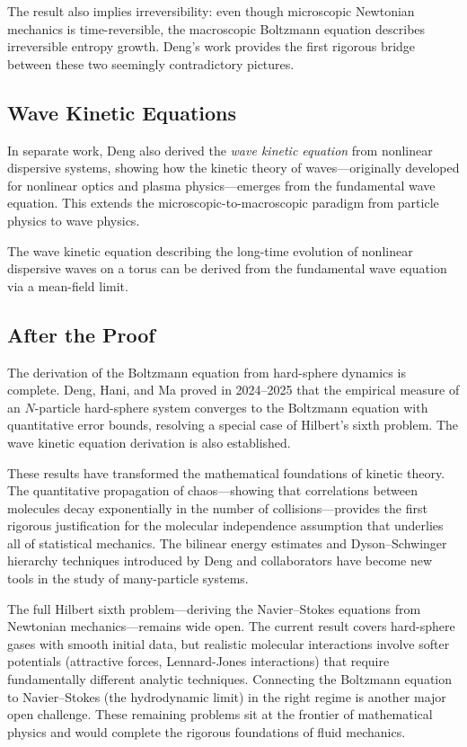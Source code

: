 \begin{highlightbox}
The result also implies irreversibility: even though microscopic Newtonian mechanics is time-reversible, the macroscopic Boltzmann equation describes irreversible entropy growth. Deng's work provides the first rigorous bridge between these two seemingly contradictory pictures.
\end{highlightbox}

\subsection{Wave Kinetic Equations}

In separate work, Deng also derived the \emph{wave kinetic equation} from nonlinear dispersive systems, showing how the kinetic theory of waves---originally developed for nonlinear optics and plasma physics---emerges from the fundamental wave equation. This extends the microscopic-to-macroscopic paradigm from particle physics to wave physics.

\begin{theorem}[Deng, 2025]
The wave kinetic equation describing the long-time evolution of nonlinear dispersive waves on a torus can be derived from the fundamental wave equation via a mean-field limit.
\end{theorem}

\subsection{After the Proof}

The derivation of the Boltzmann equation from hard-sphere dynamics is complete. Deng, Hani, and Ma proved in 2024--2025 that the empirical measure of an $N$-particle hard-sphere system converges to the Boltzmann equation with quantitative error bounds, resolving a special case of Hilbert's sixth problem. The wave kinetic equation derivation is also established.

These results have transformed the mathematical foundations of kinetic theory. The quantitative propagation of chaos---showing that correlations between molecules decay exponentially in the number of collisions---provides the first rigorous justification for the molecular independence assumption that underlies all of statistical mechanics. The bilinear energy estimates and Dyson--Schwinger hierarchy techniques introduced by Deng and collaborators have become new tools in the study of many-particle systems.

The full Hilbert sixth problem---deriving the Navier--Stokes equations from Newtonian mechanics---remains wide open. The current result covers hard-sphere gases with smooth initial data, but realistic molecular interactions involve softer potentials (attractive forces, Lennard-Jones interactions) that require fundamentally different analytic techniques. Connecting the Boltzmann equation to Navier--Stokes (the hydrodynamic limit) in the right regime is another major open challenge. These remaining problems sit at the frontier of mathematical physics and would complete the rigorous foundations of fluid mechanics.

